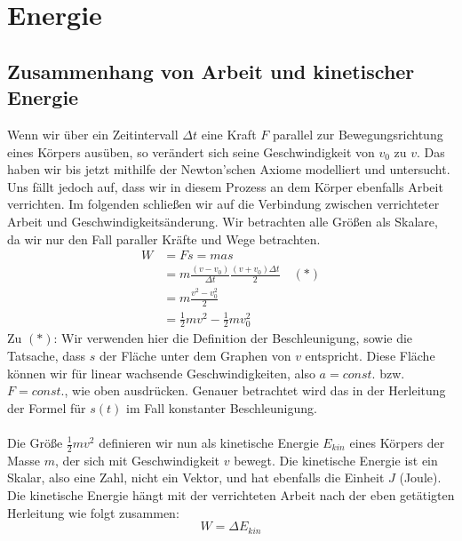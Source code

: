 \documentclass[11pt]{article}
\begin{document}
\section{Energie}
\subsection{Zusammenhang von Arbeit und kinetischer Energie}
Wenn wir über ein Zeitintervall $\Delta t$ eine Kraft $F$ parallel zur Bewegungsrichtung eines Körpers ausüben, so verändert sich seine Geschwindigkeit von $v_0$ zu $v$. Das haben wir bis jetzt mithilfe der Newton'schen Axiome modelliert und untersucht. Uns fällt jedoch auf, dass wir in diesem Prozess an dem Körper ebenfalls Arbeit verrichten. Im folgenden schließen wir auf die Verbindung zwischen verrichteter Arbeit und Geschwindigkeitsänderung. Wir betrachten alle Größen als Skalare, da wir nur den Fall paraller Kräfte und Wege betrachten. 
\begin{align*}
    W &= Fs = mas \\
    &= m \frac{(v - v_0)}{\Delta t}\frac{(v + v_0) \Delta t}{2} \quad (*) \\
    &= m\frac{v^2 - v_0^2}{2} \\
    &= \frac{1}{2}mv^2 - \frac{1}{2}mv_0^2
\end{align*}
Zu $(*)$: Wir verwenden hier die Definition der Beschleunigung, sowie die Tatsache, dass $s$ der Fläche unter dem Graphen von $v$ entspricht. Diese Fläche können wir für linear wachsende Geschwindigkeiten, also $a = const.$ bzw. $F = const.$, wie oben ausdrücken. Genauer betrachtet wird das in der Herleitung der Formel für $s(t)$ im Fall konstanter Beschleunigung.  \\\\
Die Größe $\frac{1}{2}mv^2$ definieren wir nun als kinetische Energie $E_{kin}$ eines Körpers der Masse $m$, der sich mit Geschwindigkeit $v$ bewegt. Die kinetische Energie ist ein Skalar, also eine Zahl, nicht ein Vektor, und hat ebenfalls die Einheit $J$ (Joule). Die kinetische Energie hängt mit der verrichteten Arbeit nach der eben getätigten Herleitung wie folgt zusammen: 
\begin{equation*}
    W = \Delta E_{kin}
\end{equation*}
\end{document}
